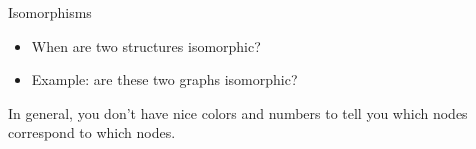 \documentclass[11pt]{beamer}
\begin{document}
\begin{frame}{Isomorphisms}

\begin{itemize}
\vfill\item When are two structures isomorphic?

\vfill\item Example: are these two graphs isomorphic?

\begin{center}
\end{center}

\end{itemize}

\vfill\footnotesize{In general, you don't have nice colors and numbers to
tell you which nodes correspond to which nodes.}

\end{frame}
\end{document}
